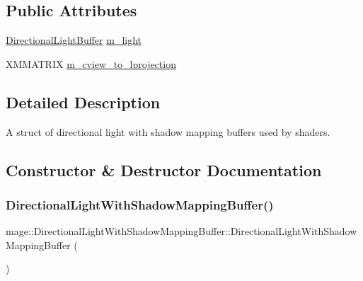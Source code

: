 \subsection*{Public Attributes}
\begin{DoxyCompactItemize}
\item 
\hyperlink{structmage_1_1_directional_light_buffer}{Directional\+Light\+Buffer} \hyperlink{structmage_1_1_directional_light_with_shadow_mapping_buffer_a911c958b0e442c927f6e8f8f73d9dbe1}{m\+\_\+light}
\item 
X\+M\+M\+A\+T\+R\+IX \hyperlink{structmage_1_1_directional_light_with_shadow_mapping_buffer_a73101e32d19de54846c3075b45ab5566}{m\+\_\+cview\+\_\+to\+\_\+lprojection}
\end{DoxyCompactItemize}


\subsection{Detailed Description}
A struct of directional light with shadow mapping buffers used by shaders. 

\subsection{Constructor \& Destructor Documentation}
\hypertarget{structmage_1_1_directional_light_with_shadow_mapping_buffer_ab3ed4045cf1367f428843f925d1e0f1f}{}\label{structmage_1_1_directional_light_with_shadow_mapping_buffer_ab3ed4045cf1367f428843f925d1e0f1f} 
\subsubsection{\texorpdfstring{Directional\+Light\+With\+Shadow\+Mapping\+Buffer()}{DirectionalLightWithShadowMappingBuffer()}\hspace{0.1cm}{\footnotesize\ttfamily [1/3]}}
{\footnotesize\ttfamily mage\+::\+Directional\+Light\+With\+Shadow\+Mapping\+Buffer\+::\+Directional\+Light\+With\+Shadow\+Mapping\+Buffer (\begin{DoxyParamCaption}{ }\end{DoxyParamCaption})\hspace{0.3cm}{\ttfamily [noexcept]}}

